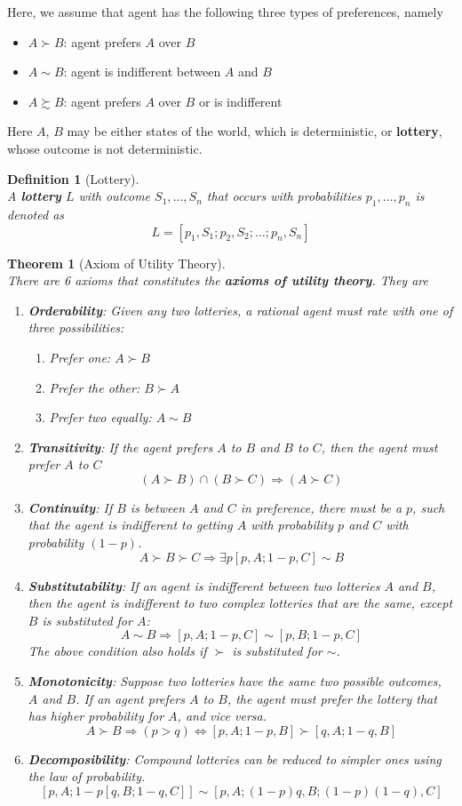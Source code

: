 \documentclass[12pt]{article}
\newtheorem{definition}{Definition}[section]
\newtheorem{theorem}{Theorem}[section]
\theoremstyle{definition}
\begin{document}
Here, we assume that agent has the following three types of preferences, namely
\begin{itemize}
	\item $A\succ B$: agent prefers $A$ over $B$
	\item $A\sim B$: agent is indifferent between $A$ and $B$
	\item $A\succsim B$: agent prefers $A$ over $B$ or is indifferent
\end{itemize}
Here $A$, $B$ may be either states of the world, which is deterministic, or \textbf{lottery}, whose outcome is not deterministic.
\begin{definition}[Lottery]
\hfill\\\normalfont A \textbf{lottery} $L$ with outcome $S_1,\ldots, S_n$ that occurs with probabilities $p_1,\ldots, p_n$ is denoted as
\[
L=[p_1,S_1;p_2,S_2;\ldots;p_n,S_n]
\]
\end{definition}
\begin{theorem}[Axiom of Utility Theory]
\hfill\\\normalfont There are 6 axioms that constitutes the \textbf{axioms of utility theory}. They are
\begin{enumerate}
	\item \textbf{Orderability}: Given any two lotteries, a rational agent must rate with one of three possibilities:
	\begin{enumerate}
		\item Prefer one: $A\succ B$
		\item Prefer the other: $B\succ A$
		\item Prefer two equally: $A\sim B$
	\end{enumerate}
	\item \textbf{Transitivity}: If the agent prefers $A$ to $B$ and $B$ to $C$, then the agent must prefer $A$ to $C$
	\[
(A\succ B)\cap (B\succ C)\Rightarrow (A\succ C)
	\]
	\item \textbf{Continuity}: If $B$ is between $A$ and $C$ in preference, there must be a $p$, such that the agent is indifferent to getting $A$ with probability $p$ and $C$ with probability $(1-p)$.
	\[
A\succ B\succ C \Rightarrow \exists p [p,A; 1-p, C]\sim B
	\]
	\item \textbf{Substitutability}: If an agent is indifferent between two lotteries $A$ and $B$, then the agent is indifferent to two complex lotteries that are the same, except $B$ is substituted for $A$:
	\[
A\sim B\Rightarrow [p,A; 1-p,C]\sim [p,B; 1-p,C]
	\]
	The above condition also holds if $\succ$ is substituted for $\sim$.
	\item \textbf{Monotonicity}: Suppose two lotteries have the same two possible outcomes, $A$ and $B$. If an agent prefers $A$ to $B$, the agent must prefer the lottery that has higher probability for $A$, and vice versa.
	\[
A\succ B \Rightarrow (p>q) \Leftrightarrow [p,A; 1-p, B]\succ [q,A; 1-q, B]
	\]
	\item \textbf{Decomposibility}: Compound lotteries can be reduced to simpler ones using the law of probability.
	\[
[p,A; 1-p[q,B; 1-q, C]] \sim [p,A; (1-p)q, B; (1-p)(1-q), C]
	\]
\end{enumerate}
\end{theorem}
\end{document}
